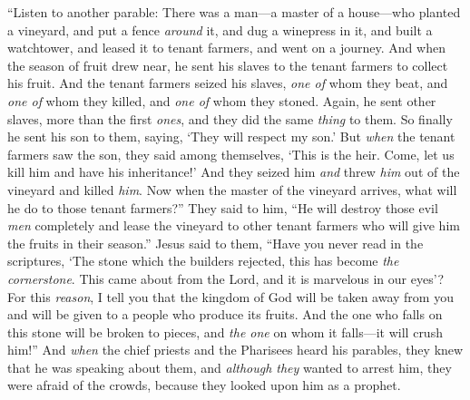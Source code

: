 \begin{biblechapter}
 “Listen to another parable: There was a man—a master of a house—who planted a vineyard, and put a fence \textit{around} it, and dug a winepress in it, and built a watchtower, and leased it to tenant farmers, and went on a journey.
\verse And when the season of fruit drew near, he sent his slaves to the tenant farmers to collect his fruit.
\verse And the tenant farmers seized his slaves, \textit{one of} whom they beat, and \textit{one of} whom they killed, and \textit{one of} whom they stoned.
\verse Again, he sent other slaves, more than the first \textit{ones}, and they did the same \textit{thing} to them.
\verse So finally he sent his son to them, saying, ‘They will respect my son.’
\verse But \textit{when} the tenant farmers saw the son, they said among themselves, ‘This is the heir. Come, let us kill him and have his inheritance!’
\verse And they seized him \textit{and} threw \textit{him} out of the vineyard and killed \textit{him}.
\verse Now when the master of the vineyard arrives, what will he do to those tenant farmers?”
\verse They said to him, “He will destroy those evil \textit{men} completely and lease the vineyard to other tenant farmers who will give him the fruits in their season.”
\verse Jesus said to them, “Have you never read in the scriptures, ‘The stone which the builders rejected, 
this has become \textit{the cornerstone}. 
This came about from the Lord, 
and it is marvelous in our eyes’?
\verse For this \textit{reason}, I tell you that the kingdom of God will be taken away from you and will be given to a people who produce its fruits.
\verse And the one who falls on this stone will be broken to pieces, and \textit{the one} on whom it falls—it will crush him!”
\verse And \textit{when} the chief priests and the Pharisees heard his parables, they knew that he was speaking about them,
\verse and \textit{although they} wanted to arrest him, they were afraid of the crowds, because they looked upon him as a prophet.
\end{biblechapter}


